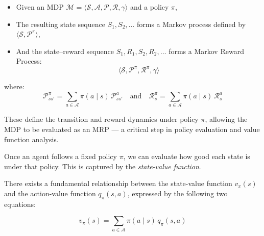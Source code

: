 \documentclass[12pt]{extreport}
\theoremstyle{definition}
\begin{document}
\begin{itemize}
  \item Given an MDP \( \mathcal{M} = \langle \mathcal{S}, \mathcal{A}, \mathcal{P}, \mathcal{R}, \gamma \rangle \) and a policy \( \pi \),
  \item The resulting state sequence \( S_1, S_2, \ldots \) forms a Markov process defined by \( \langle \mathcal{S}, \mathcal{P}^\pi \rangle \),
  \item And the state–reward sequence \( S_1, R_1, S_2, R_2, \ldots \) forms a Markov Reward Process: 
  \[
  \langle \mathcal{S}, \mathcal{P}^\pi, \mathcal{R}^\pi, \gamma \rangle
  \]
\end{itemize}

\noindent where:
\[
\mathcal{P}^\pi_{ss'} = \sum_{a \in \mathcal{A}} \pi(a \mid s) \, \mathcal{P}^a_{ss'}
\quad \text{and} \quad
\mathcal{R}^\pi_s = \sum_{a \in \mathcal{A}} \pi(a \mid s) \, \mathcal{R}^a_s
\]

\noindent These define the transition and reward dynamics under policy \( \pi \), allowing the MDP to be evaluated as an MRP — a critical step in policy evaluation and value function analysis.

\bigskip

\noindent Once an agent follows a fixed policy \( \pi \), we can evaluate how good each state is under that policy. This is captured by the \textit{state-value function}.

\begin{center}
\end{center}

\bigskip


\noindent There exists a fundamental relationship between the state-value function \( v_\pi(s) \) and the action-value function \( q_\pi(s, a) \), expressed by the following two equations:

\[
v_\pi(s) = \sum_{a \in \mathcal{A}} \pi(a \mid s) \, q_\pi(s, a)
\]
\end{document}
